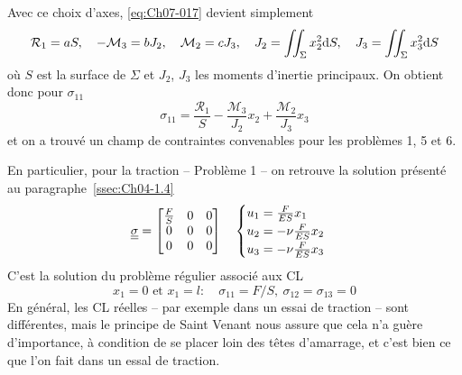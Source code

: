 Avec ce choix d'axes, \eqref{eq:Ch07-017} devient simplement
\begin{equation}
    \mathcal{R}_1 = a S, \quad -\mathcal{M}_3 = b J_2, \quad \mathcal{M}_2 = c J_3, \quad J_2 = \iint_{\Sigma} x_2^2 \mathrm{d} S, \quad J_3 = \iint_{\Sigma} x_3^2 \mathrm{d} S
    \label{eq:Ch07-021}
\end{equation}
où $S$ est la surface de $\Sigma$ et $J_2$, $J_3$ les moments d'inertie principaux.
On obtient donc pour $\sigma_{11}$
\begin{equation}
    \sigma_{11} = \frac{\mathcal{R}_1}{S} - \frac{\mathcal{M}_3}{J_2} x_2 + \frac{\mathcal{M}_2}{J_3}x_3
    \label{eq:Ch07-022}
\end{equation}
et on a trouvé un champ de contraintes convenables pour les problèmes 1, 5 et 6.

En particulier, pour la traction -- Problème 1 -- on retrouve la solution présenté au paragraphe~\ref{ssec:Ch04-1.4}
\begin{equation}
    \underline{\underline{\sigma}} = 
    \begin{bmatrix}
        \frac{F}{S} & 0 & 0 \\
        0 & 0 & 0 \\
        0 & 0 & 0
    \end{bmatrix}
    \quad
    \begin{cases}
        u_1 = \frac{F}{ES} x_1 \\
        u_2 = -\nu \frac{F}{ES} x_2 \\
        u_3 = -\nu \frac{F}{ES}  x_3
    \end{cases}
    \label{eq:Ch07-023}
\end{equation}
C'est la solution du problème régulier associé aux CL
\begin{equation}
    x_1 = 0 \text{ et } x_1 = l: \quad \sigma_{11} = F/S, \ \sigma_{12} = \sigma_{13} = 0
    \label{eq:Ch06-024}
\end{equation}
En général, les CL réelles -- par exemple dans un essai de traction -- sont différentes, mais le principe de Saint Venant nous assure que cela n'a guère d'importance, à condition de se placer loin des têtes d'amarrage, et c'est bien ce que l'on fait dans un essal de traction.

